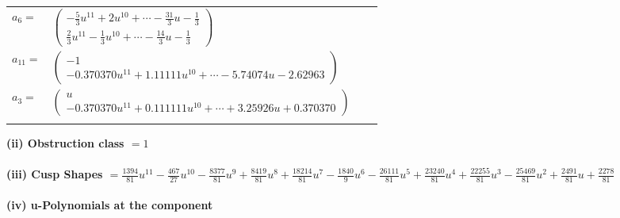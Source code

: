 \documentclass[1p]{elsarticle_modified}
\theoremstyle{definition}
\begin{document}
\begin{tabular}{m{7pt} m{180pt} m{7pt} m{180pt} }
\flushright $a_{6}=$&$\begin{pmatrix}-\frac{5}{3} u^{11}+2 u^{10}+\cdots-\frac{31}{3} u-\frac{1}{3}\\\frac{2}{3} u^{11}-\frac{1}{3} u^{10}+\cdots-\frac{14}{3} u-\frac{1}{3}\end{pmatrix}$ \\
\flushright $a_{11}=$&$\begin{pmatrix}-1\\-0.370370 u^{11}+1.11111 u^{10}+\cdots-5.74074 u-2.62963\end{pmatrix}$ \\
\flushright $a_{3}=$&$\begin{pmatrix}u\\-0.370370 u^{11}+0.111111 u^{10}+\cdots+3.25926 u+0.370370\end{pmatrix}$\\&\end{tabular}
\flushleft \textbf{(ii) Obstruction class $= 1$}\\~\\
\flushleft \textbf{(iii) Cusp Shapes $= \frac{1394}{81} u^{11}-\frac{467}{27} u^{10}-\frac{8377}{81} u^9+\frac{8419}{81} u^8+\frac{18214}{81} u^7-\frac{1840}{9} u^6-\frac{26111}{81} u^5+\frac{23240}{81} u^4+\frac{22255}{81} u^3-\frac{25469}{81} u^2+\frac{2491}{81} u+\frac{2278}{81}$}\\~\\
\newpage\renewcommand{\arraystretch}{1}
\flushleft \textbf{(iv) u-Polynomials at the component}\newline \\
\end{document}
